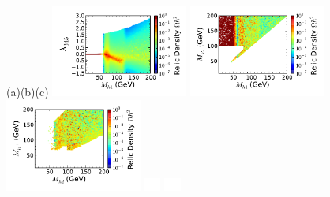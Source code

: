 \documentclass[12pt,a4paper]{article}
\begin{document}
\begin{figure}[htb]
\vskip 0.2cm
\hspace*{1.4cm}(a)\hspace*{0.35\textwidth}\hspace*{-1.4cm}(b)\hspace*{0.35\textwidth}\hspace*{-1.5cm}(c)
\vskip  0.0cm
%
{\hspace*{-0.3cm}\includegraphics[width=0.4\textwidth]{Mh1_ld345_Omega_small-cut123456_z.pdf}}%
{\hspace*{-1.55cm}\includegraphics[width=0.4\textwidth]{Mh1_Mh2_Omega_small-cut123456_z.pdf}}%
{\hspace*{-1.55cm}\includegraphics[width=0.4\textwidth]{Mhc_Mh2_Omega_small-cut123456_z.pdf}}%
\vskip -5.2cm
\hspace*{4.9cm}\includegraphics[width=0.55cm,height=4.cm]{blank.pdf}%
\hspace*{4.9cm}\includegraphics[width=0.55cm,height=4.cm]{blank.pdf}%

\end{figure}
\end{document}
